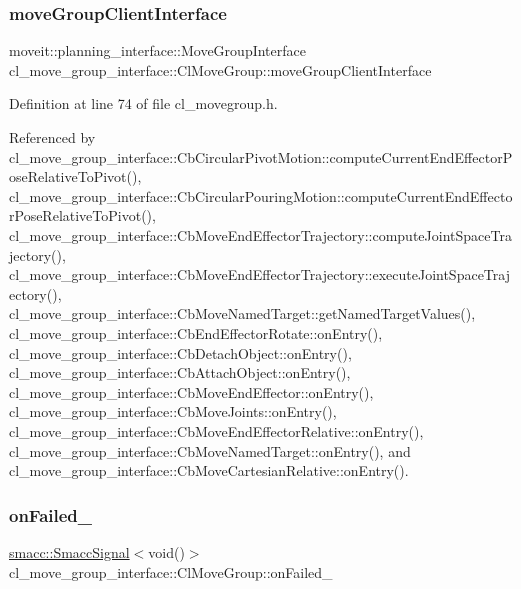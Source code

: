\subsubsection{\texorpdfstring{move\+Group\+Client\+Interface}{moveGroupClientInterface}}
{\footnotesize\ttfamily moveit\+::planning\+\_\+interface\+::\+Move\+Group\+Interface cl\+\_\+move\+\_\+group\+\_\+interface\+::\+Cl\+Move\+Group\+::move\+Group\+Client\+Interface}



Definition at line 74 of file cl\+\_\+movegroup.\+h.



Referenced by cl\+\_\+move\+\_\+group\+\_\+interface\+::\+Cb\+Circular\+Pivot\+Motion\+::compute\+Current\+End\+Effector\+Pose\+Relative\+To\+Pivot(), cl\+\_\+move\+\_\+group\+\_\+interface\+::\+Cb\+Circular\+Pouring\+Motion\+::compute\+Current\+End\+Effector\+Pose\+Relative\+To\+Pivot(), cl\+\_\+move\+\_\+group\+\_\+interface\+::\+Cb\+Move\+End\+Effector\+Trajectory\+::compute\+Joint\+Space\+Trajectory(), cl\+\_\+move\+\_\+group\+\_\+interface\+::\+Cb\+Move\+End\+Effector\+Trajectory\+::execute\+Joint\+Space\+Trajectory(), cl\+\_\+move\+\_\+group\+\_\+interface\+::\+Cb\+Move\+Named\+Target\+::get\+Named\+Target\+Values(), cl\+\_\+move\+\_\+group\+\_\+interface\+::\+Cb\+End\+Effector\+Rotate\+::on\+Entry(), cl\+\_\+move\+\_\+group\+\_\+interface\+::\+Cb\+Detach\+Object\+::on\+Entry(), cl\+\_\+move\+\_\+group\+\_\+interface\+::\+Cb\+Attach\+Object\+::on\+Entry(), cl\+\_\+move\+\_\+group\+\_\+interface\+::\+Cb\+Move\+End\+Effector\+::on\+Entry(), cl\+\_\+move\+\_\+group\+\_\+interface\+::\+Cb\+Move\+Joints\+::on\+Entry(), cl\+\_\+move\+\_\+group\+\_\+interface\+::\+Cb\+Move\+End\+Effector\+Relative\+::on\+Entry(), cl\+\_\+move\+\_\+group\+\_\+interface\+::\+Cb\+Move\+Named\+Target\+::on\+Entry(), and cl\+\_\+move\+\_\+group\+\_\+interface\+::\+Cb\+Move\+Cartesian\+Relative\+::on\+Entry().

\mbox{\label{classcl__move__group__interface_1_1ClMoveGroup_a3e0ea6acf70a0c527864b712b215033b}} 
\subsubsection{\texorpdfstring{on\+Failed\+\_\+}{onFailed\_}}
{\footnotesize\ttfamily \hyperlink{classsmacc_1_1SmaccSignal}{smacc\+::\+Smacc\+Signal}$<$void()$>$ cl\+\_\+move\+\_\+group\+\_\+interface\+::\+Cl\+Move\+Group\+::on\+Failed\+\_\+\hspace{0.3cm}{\ttfamily [private]}}



